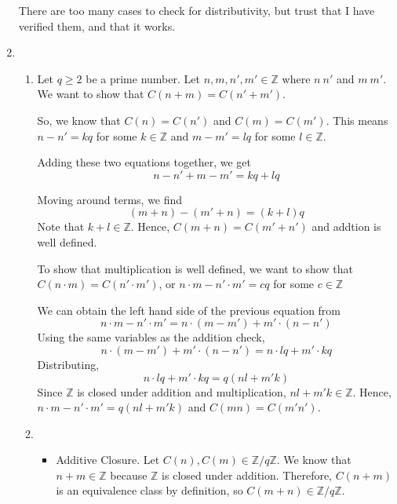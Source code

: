 \documentclass[12pt]{article}
\begin{document}
\begin{enumerate}[start=1,label={\bfseries Problem \arabic*:},leftmargin=1in]
    There are too many cases to check for distributivity, but trust that I have verified them, and that it works. 

    \item \begin{enumerate}
        \item Let $q \geq 2$ be a prime number. Let $n, m, n', m' \in \mathbb{Z}$ where $n ~ n'$ and $m ~ m'$. 
         We want to show that $C(n + m) = C(n' + m')$. 

         So, we know that $C(n) = C(n')$ and $C(m) = C(m')$. This means $n - n' = kq$ for some $k \in \mathbb{Z}$ 
         and $m - m' = lq$ for some $l \in \mathbb{Z}$. 

         Adding these two equations together, we get 
         \[
            n - n' + m - m' = kq + lq
         \]

         Moving around terms, we find 
         \[
            (m + n) - (m' + n) = (k + l)q
         \]
        Note that $k + l \in \mathbb{Z}$. Hence, $C(m + n) = C(m' + n')$ and addtion is well defined. 

        To show that multiplication is well defined, we want to show that $C(n \cdot m) = C(n' \cdot m')$, or $n\cdot m - n' \cdot m' = cq$ for some $c \in \mathbb{Z}$
    
        We can obtain the left hand side of the previous equation from 
        \[
            n\cdot m - n' \cdot m' = n \cdot (m - m') + m' \cdot (n - n')
        \]
        Using the same variables as the addition check, 
        \[
            n \cdot (m - m') + m' \cdot (n - n') = n \cdot lq + m' \cdot kq
        \]
        Distributing, 
        \[
            n \cdot lq + m' \cdot kq = q(nl + m'k)
        \]
        Since $\mathbb{Z}$ is closed under addition and multiplication, $nl + m'k \in \mathbb{Z}$. 
        Hence, $n\cdot m - n' \cdot m' = q(nl + m'k)$ and $C(mn) = C(m'n')$. 
        \item \begin{itemize}
            \item Additive Closure. Let $C(n), C(m) \in \mathbb{Z}/q\mathbb{Z}$. We know that $n + m \in \mathbb{Z}$ because $\mathbb{Z}$ is closed under addition. 
            Therefore, $C(n + m)$ is an equivalence class by definition, so $C(m+n) \in \mathbb{Z}/q\mathbb{Z}$. 
             

\end{itemize}
\end{enumerate}
\end{enumerate}
\end{document}
